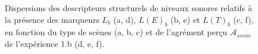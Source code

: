 \begin{figure}[t]
       \caption{Dispersions des descripteurs structurels de niveaux sonores relatifs à la présence des marqueurs $L_b$ (a, d), $L(E)_b$ (b, e) et $L(T)_b$ (c, f), en fonction du type de scènes (a, b, c) et de l'agrément perçu $\mathcal{A}_{scene}$ de l'expérience 1.b (d, e, f).}\label{fig:soundlevelNoise}
\end{figure}

